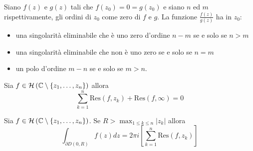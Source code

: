 \begin{thm}
Siano $f(z)$ e $g(z)$ tali che $f\left( z_{0}\right) =0=g\left( z_{0}\right)$ e siano $n$ ed $m$ rispettivamente, gli ordini di $z_{0}$ come zero di $f$ e $g$. La funzione $\frac{f(z)}{g(z)}$ ha in $z_{0}$:

\begin{itemize}
\item una singolarità eliminabile che è uno zero d'ordine $n-m$ se e solo se $n >m$
\item una singolarità eliminabile che non è uno zero se e solo se $n=m$
\item un polo d'ordine $m-n$ se e solo se $m >n$.
\end{itemize}
\end{thm}
\begin{thm}
Sia $f\in \mathcal{H} \left(\mathbb{C} \setminus \left\{z_{1} ,\dotsc ,z_{n}\right\}\right)$ allora
\begin{equation*}
\sum\limits ^{n}_{k=1}\mathrm{Res}\left( f,z_{k}\right) +\mathrm{Res}\left( f,\infty \right) =0
\end{equation*}
\end{thm}
\begin{thm}
Sia $f\in \mathcal{H} \left(\mathbb{C} \setminus \left\{z_{1} ,\dotsc ,z_{n}\right\}\right)$. Se $R >\max_{1\leqslant k\leqslant n}\left| z_{k}\right| $ allora
\begin{equation*}
\int\nolimits _{\partial D\left( 0,R\right)} f\left( z\right) dz=2\pi i\left[\sum\limits ^{n}_{k=1}\mathrm{Res}\left( f,z_{k}\right)\right]
\end{equation*}
\end{thm}
